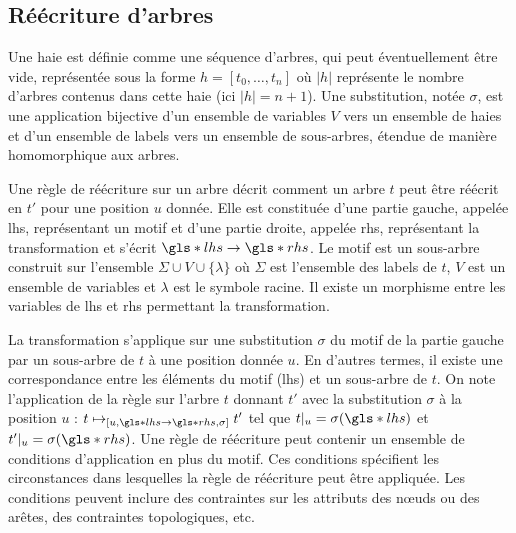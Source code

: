 \pagebreak
\subsection{Réécriture d'arbres}
\label{sec:struct:pre:tree-rewritting}

\begin{definition}[Haie]
    Une haie est définie comme une séquence d'arbres, qui peut éventuellement être vide, représentée sous la forme $h = [t_0, \dots , t_n]$ où $|h|$ représente le nombre d'arbres contenus dans cette haie (ici $|h| = n + 1$).
    Une substitution, notée $\sigma$, est une application bijective d'un ensemble de variables $V$ vers un ensemble de haies et d'un ensemble de labels vers un ensemble de sous-arbres, étendue de manière homomorphique aux arbres.
\end{definition}

\begin{definition}
    Une règle de réécriture sur un arbre décrit comment un arbre $t$ peut être réécrit en $t'$ pour une position $u$ donnée.
    Elle est constituée d'une partie gauche, appelée \gls{lhs}, représentant un motif et d'une partie droite, appelée \gls{rhs}, représentant la transformation et s'écrit $\gls*{lhs} \to \gls*{rhs}$.
    Le motif est un sous-arbre construit sur l'ensemble $\Sigma \cup V \cup \{\lambda\}$ où $\Sigma$ est l'ensemble des labels de $t$, $V$ est un ensemble de variables et $\lambda$ est le symbole racine.
    Il existe un morphisme entre les variables de \gls{lhs} et \gls{rhs} permettant la transformation.

    La transformation s'applique sur une substitution $\sigma$ du motif de la partie gauche par un sous-arbre de $t$ à une position donnée $u$.
    En d'autres termes, il existe une correspondance entre les éléments du motif (\gls{lhs}) et un sous-arbre de $t$.
    On note l'application de la règle sur l'arbre $t$ donnant $t'$ avec la substitution $\sigma$ à la position $u$ : $t \mapsto_{[u, \gls*{lhs} \to \gls*{rhs}, \sigma]} t'$ tel que $t|_u = \sigma(\gls*{lhs})$ et $t'|_u = \sigma(\gls*{rhs})$.
    Une règle de réécriture peut contenir un ensemble de conditions d'application en plus du motif.
    Ces conditions spécifient les circonstances dans lesquelles la règle de réécriture peut être appliquée.
    Les conditions peuvent inclure des contraintes sur les attributs des nœuds ou des arêtes, des contraintes topologiques, etc.
\end{definition}

